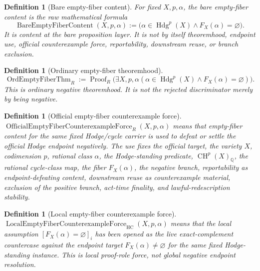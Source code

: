 \documentclass[11pt]{article}
\newtheorem{definition}[theorem]{Definition}
\newcommand{\QQ}{\mathbb{Q}}
\newcommand{\CH}{\operatorname{CH}}
\newcommand{\Hdg}{\operatorname{Hdg}}
\newcommand{\HC}{\operatorname{HC}}
\begin{document}
\begin{definition}[Bare empty-fiber content]
For fixed $X,p,\alpha$, the bare empty-fiber content is the raw mathematical formula
\[
\operatorname{BareEmptyFiberContent}(X,p,\alpha)
:=\bigl(\alpha\in\Hdg^p(X)\wedge F_X(\alpha)=\varnothing\bigr).
\]
It is content at the bare proposition layer.  It is not by itself theoremhood, endpoint use, official counterexample force, reportability, downstream reuse, or branch exclusion.
\end{definition}

\begin{definition}[Ordinary empty-fiber theoremhood]
\[
\operatorname{OrdEmptyFiberThm}_R:=\operatorname{Proof}_R\bigl(\exists X,p,\alpha(\alpha\in\Hdg^p(X)\wedge F_X(\alpha)=\varnothing)\bigr).
\]
This is ordinary negative theoremhood.  It is not the rejected discriminator merely by being negative.
\end{definition}

\begin{definition}[Official empty-fiber counterexample force]
$\operatorname{OfficialEmptyFiberCounterexampleForce}_R(X,p,\alpha)$ means that empty-fiber content for the same fixed Hodge/cycle carrier is used to defeat or settle the official Hodge endpoint negatively.  The use fixes the official target, the variety $X$, codimension $p$, rational class $\alpha$, the Hodge-standing predicate, $\CH^p(X)_\QQ$, the rational cycle-class map, the fiber $F_X(\alpha)$, the negative branch, reportability as endpoint-defeating content, downstream reuse as counterexample material, exclusion of the positive branch, act-time finality, and lawful-redescription stability.
\end{definition}

\begin{definition}[Local empty-fiber counterexample force]
$\operatorname{LocalEmptyFiberCounterexampleForce}_{\HC}(X,p,\alpha)$ means that the local assumption $[F_X(\alpha)=\varnothing]_i$ has been opened as the live exact-complement countercase against the endpoint target $F_X(\alpha)\neq\varnothing$ for the same fixed Hodge-standing instance.  This is local proof-role force, not global negative endpoint resolution.
\end{definition}
\end{document}
